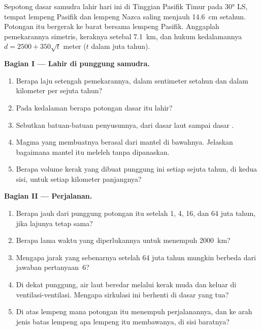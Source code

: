 \begin{problem}
\label{pb:g11:ocean-ridges:1}
Sepotong dasar samudra lahir hari ini di Tinggian Pasifik Timur pada \ang{30}
LS, tempat lempeng Pasifik dan lempeng Nazca saling menjauh \qty{14.6}{cm}
setahun. Potongan itu bergerak ke barat bersama lempeng Pasifik. Anggaplah
pemekarannya simetris, keraknya setebal \qty{7.1}{km}, dan hukum kedalamannya
$d = 2500 + 350\sqrt{t}$ meter ($t$ dalam juta tahun).

\medskip
\noindent\textbf{Bagian I --- Lahir di punggung samudra.}
\begin{enumerate}
  \item Berapa laju setengah pemekarannya, dalam sentimeter setahun dan dalam
        kilometer per sejuta tahun?
  \item Pada kedalaman berapa potongan dasar itu lahir?
  \item Sebutkan batuan-batuan penyusunnya, dari dasar laut sampai dasar
        .
  \item Magma yang membuatnya berasal dari mantel di bawahnya. Jelaskan
        bagaimana mantel itu meleleh tanpa dipanaskan.
  \item Berapa volume kerak yang dibuat punggung ini setiap sejuta tahun, di
        kedua sisi, untuk setiap kilometer panjangnya?
\end{enumerate}

\medskip
\noindent\textbf{Bagian II --- Perjalanan.}
\begin{enumerate}[resume]
  \item Berapa jauh dari punggung potongan itu setelah 1, 4, 16, dan 64
        juta tahun, jika lajunya tetap sama?
  \item Berapa lama waktu yang diperlukannya untuk menempuh \qty{2000}{km}?
  \item Mengapa jarak yang sebenarnya setelah 64 juta tahun mungkin berbeda
        dari jawaban pertanyaan~6?
  \item Di dekat punggung, air laut beredar melalui kerak muda dan keluar di
        ventilasi-ventilasi. Mengapa sirkulasi ini berhenti di dasar yang tua?
  \item Di atas lempeng mana potongan itu menempuh perjalanannya, dan ke arah
        jenis batas lempeng apa lempeng itu membawanya, di sisi baratnya?
\end{enumerate}


\end{problem}
